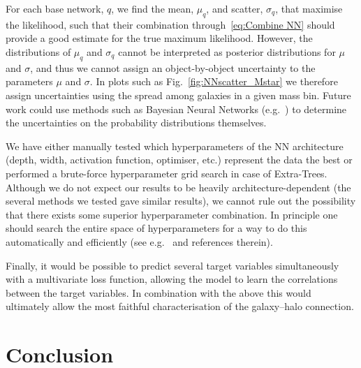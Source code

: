 \documentclass[usenatbib,useAMS]{mnras}
\begin{document}
For each base network, $q$, we find the mean, $\mu_q$, and scatter, $\sigma_q$, that maximise the likelihood, such that their combination through~\cref{eq:Combine NN} should provide a good estimate for the true maximum likelihood. However, the distributions of $\mu_q$ and $\sigma_q$ cannot be interpreted as posterior distributions for $\mu$ and $\sigma$, and thus we cannot assign an object-by-object uncertainty to the parameters $\mu$ and $\sigma$. In plots such as Fig.~\ref{fig:NNscatter_Mstar} we therefore assign uncertainties using the spread among galaxies in a given mass bin. Future work could use methods such as Bayesian Neural Networks (e.g.~\citet{BayesNN}) to determine the uncertainties on the probability distributions themselves.

We have either manually tested which hyperparameters of the NN architecture (depth, width, activation function, optimiser, etc.) represent the data the best or performed a brute-force hyperparameter grid search in case of Extra-Trees. Although we do not expect our results to be heavily architecture-dependent (the several methods we tested gave similar results), we cannot rule out the possibility that there exists some superior hyperparameter combination. In principle one should search the entire space of hyperparameters for a way to do this automatically and efficiently (see e.g.~\citealt{Optuna} and references therein).

Finally, it would be possible to predict several target variables simultaneously with a multivariate loss function, allowing the model to learn the correlations between the target variables. In combination with the above this would ultimately allow the most faithful characterisation of the galaxy--halo connection.


\section{Conclusion}\label{sec:Conclusion}
\end{document}
